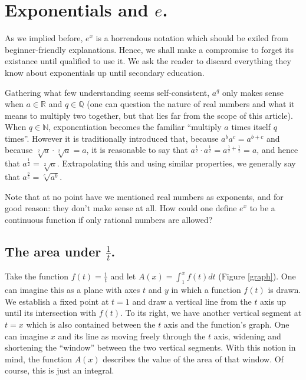 \section{Exponentials and $e$.}

As we implied before, $e^x$ is a horrendous notation which should be exiled from beginner-friendly explanations. Hence, we shall make a compromise to forget its existance until qualified to use it. We ask the reader to discard everything they know about exponentials up until secondary education.

Gathering what few understanding seems self-consistent, $a^q$ only makes sense when $a \in \mathbb{R}$ and $q \in \mathbb{Q}$ (one can question the nature of real numbers and what it means to multiply two together, but that lies far from the scope of this article). When $q \in \mathbb{N}$, exponentiation becomes the familiar \enquote{multiply $a$ times itself $q$ times}. However it is traditionally introduced that, because $a^b a^c = a^{b + c}$ and because $\sqrt[2]{a} \cdot \sqrt[2]{a} = a$, it is reasonable to say that $a^{\frac{1}{2}}\cdot a^{\frac{1}{2}} = a^{\frac{1}{2} + \frac{1}{2}} = a$, and hence that $a^{\frac{1}{2}} = \sqrt[2]{a}$. Extrapolating this and using similar properties, we generally say that $a^{\frac{b}{c}} = \sqrt[c]{a^b}$.

Note that at no point have we mentioned real numbers as exponents, and for good reason: they don’t make sense at all. How could one define $e^x$ to be a continuous function if only rational numbers are allowed?

\subsection{The area under $\frac{1}{t}$.}

Take the function $f(t) = \frac{1}{t}$ and let $A(x) = \int_1^x f(t) dt$ (Figure \ref{graph}). One can imagine this as a plane with axes $t$ and $y$ in which a function $f(t)$ is drawn. We establish a fixed point at $t = 1$ and draw a vertical line from the $t$ axis up until its intersection with $f(t)$. To its right, we have another vertical segment at $t = x$ which is also contained between the $t$ axis and the function’s graph. One can imagine $x$ and its line as moving freely through the $t$ axis, widening and shortening the \enquote{window} between the two vertical segments. With this notion in mind, the function $A(x)$ describes the value of the area of that window. Of course, this is just an integral.

